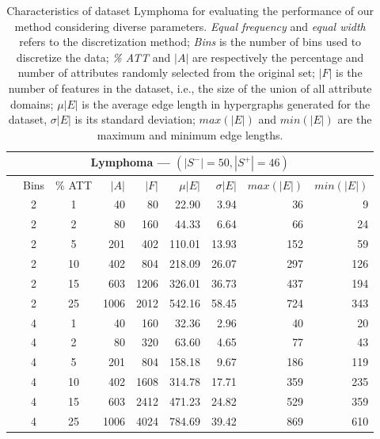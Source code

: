 \documentclass[12pt,a4paper]{article}
\begin{document}
\begin{table}
\caption
{Characteristics of dataset Lymphoma for evaluating the performance of our method considering diverse parameters.
\emph{Equal frequency} and \emph{equal width} refers to the discretization method;
\emph{Bins} is the number of bins used to discretize the data; \emph{\% ATT} and $|A|$ are respectively the percentage
and number of attributes randomly selected from the original set; $|F|$ is the number of features in the dataset, i.e., the
size of the union of all attribute domains; $\mu{|E|}$ is the average edge length in hypergraphs generated for the dataset,
$\sigma{|E|}$ is its standard deviation; $max(|E|)$ and $min(|E|)$ are the maximum and minimum edge lengths.}
\label{exp:lymphoma}
\begin{center}\small
\begin{tabular}{cccrrrrrr}
\hline
\multicolumn{9}{c}{\parbox{10cm}{\vspace{0.1cm}\centering \textbf{\large Lymphoma} --- $(|S^{-}|=50, |S^{+}|=46)$\vspace{0.1cm}}} \\\hline
\parbox{0.1cm}{\vspace{0.5cm}}& Bins & \% ATT & $|A|$ & $|F|$ & $\mu{|E|}$ & $\sigma{|E|}$ & $max(|E|)$ & $min(|E|)$ \\\hline

&  2 & 1 &  40 &  80  & 22.90 & 3.94 &  36 &   9 \\ 
&  2 & 2 &  80 & 160  & 44.33 & 6.64 &  66 &  24 \\ 
&  2 & 5 & 201 & 402  & 110.01 & 13.93 & 152 &  59 \\
&  2 & 10 & 402 & 804  & 218.09 & 26.07 & 297 & 126 \\ 
& 2 & 15 & 603 & 1206  & 326.01 & 36.73 & 437 & 194 \\ 
&  2 & 25 & 1006 & 2012  & 542.16 & 58.45 & 724 & 343 \\ 
&  4 & 1 &  40 & 160  & 32.36 & 2.96 &  40 &  20 \\  
&  4 & 2 &  80 & 320  & 63.60 & 4.65 &  77 &  43 \\ 
&  4 & 5 & 201 & 804  & 158.18 & 9.67 & 186 & 119 \\
&  4 & 10 & 402 & 1608  & 314.78 & 17.71 & 359 & 235 \\ 
&  4 & 15 & 603 & 2412  & 471.23 & 24.82 & 529 & 359 \\ 
&  4 & 25 & 1006 & 4024  & 784.69 & 39.42 & 869 & 610 \\ \hline


\end{tabular}
\end{center}
\end{table}
\end{document}
